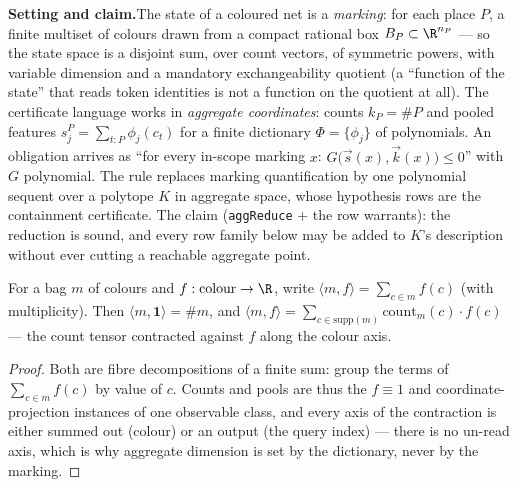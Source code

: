 

\textbf{Setting and claim.}\enspace The state of a coloured net is a
\emph{marking}: for each place $P$, a finite multiset of colours drawn
from a compact rational box $B_P \subset \R^{n_P}$ --- so the state
space is a disjoint sum, over count vectors, of symmetric powers, with
variable dimension and a mandatory exchangeability quotient (a
``function of the state'' that reads token identities is not a function
on the quotient at all). The certificate language works in
\emph{aggregate coordinates}: counts $k_P = \#P$ and pooled features
$s^P_j = \sum_{t : P} \phi_j(c_t)$ for a finite dictionary
$\Phi = \{\phi_j\}$ of polynomials. An obligation arrives as
``for every in-scope marking $x$:
$G\bigl(\vec{s}(x), \vec{k}(x)\bigr) \leq 0$'' with $G$ polynomial. The
rule replaces marking quantification by one polynomial sequent over a
polytope $K$ in aggregate space, whose hypothesis rows are the
containment certificate. The claim (\texttt{aggReduce} + the row
warrants): the reduction is sound, and every row family below may be
added to $K$'s description without ever cutting a reachable aggregate
point.

\begin{blemma}
\label{lem:qar-query}
For a bag $m$ of colours and $f : \text{colour} \to \R$, write
$\langle m, f \rangle = \sum_{c \in m} f(c)$ (with multiplicity). Then
$\langle m, \mathbf{1} \rangle = \#m$, and
$\langle m, f \rangle = \sum_{c \in \mathrm{supp}(m)}
\mathrm{count}_m(c) \cdot f(c)$ --- the count tensor contracted against
$f$ along the colour axis.
\end{blemma}
\begin{proof}
Both are fibre decompositions of a finite sum: group the terms of
$\sum_{c \in m} f(c)$ by value of $c$. Counts and pools are thus the
$f \equiv 1$ and coordinate-projection instances of one observable
class, and every axis of the contraction is either summed out (colour)
or an output (the query index) --- there is no un-read axis, which is
why aggregate dimension is set by the dictionary, never by the marking.
\end{proof}

